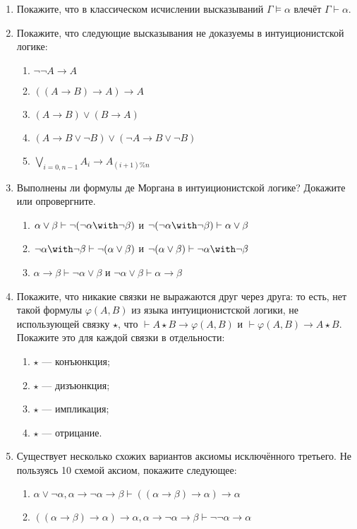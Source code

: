 \documentclass[10pt,a4paper,oneside]{article}
\begin{document}
\begin{enumerate}
\item Покажите, что в классическом исчислении высказываний $\Gamma \models \alpha$ влечёт $\Gamma \vdash \alpha$.

\item Покажите, что следующие высказывания не доказуемы в интуиционистской логике:
\begin{enumerate}
\item $\neg\neg A \rightarrow A$
\item $((A \rightarrow B) \rightarrow A) \rightarrow A$
\item $(A \rightarrow B) \vee (B \rightarrow A)$
\item $(A \rightarrow B \vee \neg B) \vee (\neg A \rightarrow B \vee \neg B)$
\item $\bigvee_{i=0,n-1} A_i \rightarrow A_{(i+1) \% n}$
\end{enumerate}

\item Выполнены ли формулы де Моргана в интуиционистской логике? Докажите или опровергните.
\begin{enumerate}
\item $\alpha\vee\beta \vdash \neg(\neg\alpha\with\neg\beta)$ и $\neg(\neg\alpha\with\neg\beta) \vdash \alpha\vee\beta$
\item $\neg\alpha\with\neg\beta \vdash \neg(\alpha\vee\beta)$ и $\neg(\alpha\vee\beta) \vdash \neg\alpha\with\neg\beta$
\item $\alpha\rightarrow\beta \vdash \neg\alpha\vee\beta$ и $\neg\alpha\vee\beta \vdash \alpha\rightarrow\beta$
\end{enumerate}

\item Покажите, что никакие связки не выражаются друг через друга: то есть, нет такой формулы $\varphi(A,B)$ из языка 
интуиционистской логики, не использующей связку $\star$, что $\vdash A \star B \rightarrow \varphi(A,B)$ и $\vdash\varphi(A,B) \rightarrow A \star B$.
Покажите это для каждой связки в отдельности:
\begin{enumerate}
\item $\star$ --- конъюнкция;
\item $\star$ --- дизъюнкция;
\item $\star$ --- импликация;
\item $\star$ --- отрицание.
\end{enumerate}

\item Существует несколько схожих вариантов аксиомы исключённого третьего. Не пользуясь 10 схемой аксиом, покажите
следующее:
\begin{enumerate}
\item $\alpha\vee\neg\alpha, \alpha\rightarrow\neg\alpha\rightarrow\beta \vdash ((\alpha\rightarrow\beta)\rightarrow\alpha)\rightarrow\alpha$
\item $((\alpha\rightarrow\beta)\rightarrow\alpha)\rightarrow\alpha, \alpha\rightarrow\neg\alpha\rightarrow\beta \vdash \neg\neg\alpha\rightarrow\alpha$
\end{enumerate}


\end{enumerate}
\end{document}

